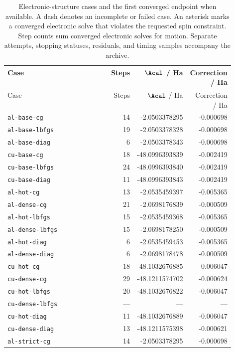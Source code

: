 \begin{longtable}{p{0.53\linewidth}rrr}
\caption{Electronic-structure cases and the first converged endpoint when available. A dash denotes an incomplete or failed case. An asterisk marks a converged electronic solve that violates the requested spin constraint. Step counts sum converged electronic solves for motion. Separate attempts, stopping statuses, residuals, and timing samples accompany the archive.}\label{tab:allcases}\\
\toprule Case & Steps & $\Acal$ / Ha & Correction / Ha\\\midrule\endfirsthead
\toprule Case & Steps & $\Acal$ / Ha & Correction / Ha\\\midrule\endhead
\nolinkurl{al-base-cg} & 14 & -2.0503378295 & -0.000698\\
\nolinkurl{al-base-lbfgs} & 19 & -2.0503378328 & -0.000698\\
\nolinkurl{al-base-diag} & 6 & -2.0503378343 & -0.000698\\
\nolinkurl{cu-base-cg} & 18 & -48.0996393839 & -0.002419\\
\nolinkurl{cu-base-lbfgs} & 24 & -48.0996393840 & -0.002419\\
\nolinkurl{cu-base-diag} & 11 & -48.0996393843 & -0.002419\\
\nolinkurl{al-hot-cg} & 13 & -2.0535459397 & -0.005365\\
\nolinkurl{al-dense-cg} & 21 & -2.0698176839 & -0.000509\\
\nolinkurl{al-hot-lbfgs} & 15 & -2.0535459368 & -0.005365\\
\nolinkurl{al-dense-lbfgs} & 15 & -2.0698178250 & -0.000509\\
\nolinkurl{al-hot-diag} & 6 & -2.0535459453 & -0.005365\\
\nolinkurl{al-dense-diag} & 6 & -2.0698178478 & -0.000509\\
\nolinkurl{cu-hot-cg} & 18 & -48.1032676885 & -0.006047\\
\nolinkurl{cu-dense-cg} & 29 & -48.1211574702 & -0.000624\\
\nolinkurl{cu-hot-lbfgs} & 20 & -48.1032676822 & -0.006047\\
\nolinkurl{cu-dense-lbfgs} & --- & --- & ---\\
\nolinkurl{cu-hot-diag} & 11 & -48.1032676889 & -0.006047\\
\nolinkurl{cu-dense-diag} & 13 & -48.1211575398 & -0.000621\\
\nolinkurl{al-strict-cg} & 14 & -2.0503378295 & -0.000698\\

\end{longtable}
